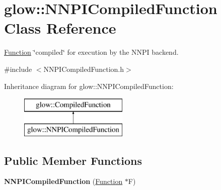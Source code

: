 \hypertarget{classglow_1_1_n_n_p_i_compiled_function}{}\section{glow\+:\+:N\+N\+P\+I\+Compiled\+Function Class Reference}
\label{classglow_1_1_n_n_p_i_compiled_function}


\hyperlink{classglow_1_1_function}{Function} \char`\"{}compiled\char`\"{} for execution by the N\+N\+PI backend.  




{\ttfamily \#include $<$N\+N\+P\+I\+Compiled\+Function.\+h$>$}

Inheritance diagram for glow\+:\+:N\+N\+P\+I\+Compiled\+Function\+:\begin{figure}[H]
\begin{center}
\leavevmode
\includegraphics[height=2.000000cm]{classglow_1_1_n_n_p_i_compiled_function}
\end{center}
\end{figure}
\subsection*{Public Member Functions}
\begin{DoxyCompactItemize}
\item 
\mbox{\label{classglow_1_1_n_n_p_i_compiled_function_ace4d4ebea948312e04abde877c74fdf2}} 
{\bfseries N\+N\+P\+I\+Compiled\+Function} (\hyperlink{classglow_1_1_function}{Function} $\ast$F)
\end{DoxyCompactItemize}
